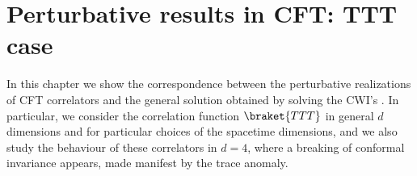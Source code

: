 \documentclass[a4paper,11pt,openright,twoside]{book}
\numberwithin{equation}{section}
\begin{document}
{{%
\chapter{Perturbative results in CFT: TTT case}\label{PerturbativeTTT}
In this chapter we show the correspondence between the perturbative realizations of CFT correlators and the general solution obtained by solving the CWI's \cite{Coriano:2018bsy, Coriano:2018bbe,Coriano:2018zdo}. 
In particular, we consider the correlation function $\braket{TTT}$ in general $d$ dimensions and for particular choices of the spacetime dimensions, and we also study the behaviour of these correlators in $d = 4$, where a breaking of conformal invariance appears, made manifest by the trace anomaly.
}}
\end{document}
